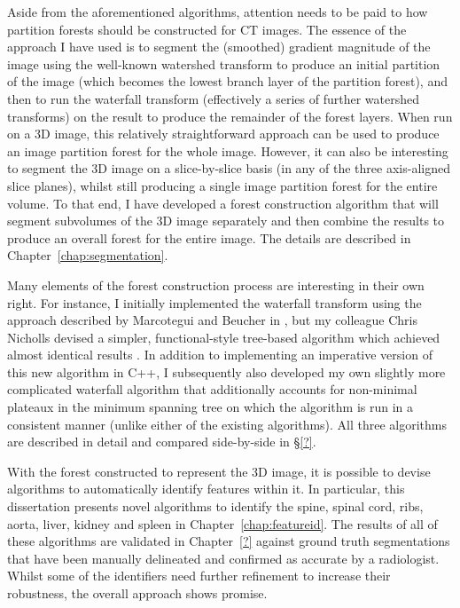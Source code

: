 Aside from the aforementioned algorithms, attention needs to be paid to how partition forests should be constructed for CT images. The essence of the approach I have used is to segment the (smoothed) gradient magnitude of the image using the well-known watershed transform \cite{beucher90} to produce an initial partition of the image (which becomes the lowest branch layer of the partition forest), and then to run the waterfall transform \cite{marcotegui05} (effectively a series of further watershed transforms) on the result to produce the remainder of the forest layers. When run on a 3D image, this relatively straightforward approach can be used to produce an image partition forest for the whole image. However, it can also be interesting to segment the 3D image on a slice-by-slice basis (in any of the three axis-aligned slice planes), whilst still producing a single image partition forest for the entire volume. To that end, I have developed a forest construction algorithm that will segment subvolumes of the 3D image separately and then combine the results to produce an overall forest for the entire image. The details are described in Chapter~\ref{chap:segmentation}.

Many elements of the forest construction process are interesting in their own right. For instance, I initially implemented the waterfall transform using the approach described by Marcotegui and Beucher in \cite{marcotegui05}, but my colleague Chris Nicholls devised a simpler, functional-style tree-based algorithm which achieved almost identical results \cite{nicholls09}. In addition to implementing an imperative version of this new algorithm in C++, I subsequently also developed my own slightly more complicated waterfall algorithm that additionally accounts for non-minimal plateaux in the minimum spanning tree on which the algorithm is run in a consistent manner (unlike either of the existing algorithms). All three algorithms are described in detail and compared side-by-side in \S\ref{?}.

With the forest constructed to represent the 3D image, it is possible to devise algorithms to automatically identify features within it. In particular, this dissertation presents novel algorithms to identify the spine, spinal cord, ribs, aorta, liver, kidney and spleen in Chapter~\ref{chap:featureid}. The results of all of these algorithms are validated in Chapter~\ref{?} against ground truth segmentations that have been manually delineated and confirmed as accurate by a radiologist. Whilst some of the identifiers need further refinement to increase their robustness, the overall approach shows promise.

